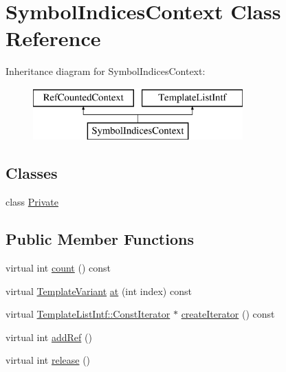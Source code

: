 \hypertarget{class_symbol_indices_context}{}\section{Symbol\+Indices\+Context Class Reference}
\label{class_symbol_indices_context}
Inheritance diagram for Symbol\+Indices\+Context\+:\begin{figure}[H]
\begin{center}
\leavevmode
\includegraphics[height=2.000000cm]{class_symbol_indices_context}
\end{center}
\end{figure}
\subsection*{Classes}
\begin{DoxyCompactItemize}
\item 
class \mbox{\hyperlink{class_symbol_indices_context_1_1_private}{Private}}
\end{DoxyCompactItemize}
\subsection*{Public Member Functions}
\begin{DoxyCompactItemize}
\item 
virtual int \mbox{\hyperlink{class_symbol_indices_context_a2870f659954519c255fb67ac97ca04d6}{count}} () const
\item 
virtual \mbox{\hyperlink{class_template_variant}{Template\+Variant}} \mbox{\hyperlink{class_symbol_indices_context_a246d9d512a0daa50f0cdd0c2abfb86af}{at}} (int index) const
\item 
virtual \mbox{\hyperlink{class_template_list_intf_1_1_const_iterator}{Template\+List\+Intf\+::\+Const\+Iterator}} $\ast$ \mbox{\hyperlink{class_symbol_indices_context_ad0b75214155417ec6ce8477a6a607103}{create\+Iterator}} () const
\item 
virtual int \mbox{\hyperlink{class_symbol_indices_context_aa4cc95c4e452e146f0b0e72142f5f1bf}{add\+Ref}} ()
\item 
virtual int \mbox{\hyperlink{class_symbol_indices_context_a9912083441aa4e5f250ecbbc088cf275}{release}} ()
\end{DoxyCompactItemize}
